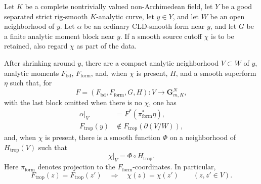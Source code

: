

\begin{lemma}
\label{lem:p21p3-gf-legal-source-localization}
Let \(K\) be a complete nontrivially valued non-Archimedean field, let
\(Y\) be a good separated strict rig-smooth \(K\)-analytic curve, let
\(y\in Y\), and let \(W\) be an open neighborhood of \(y\).  Let \(\alpha\)
be an ordinary CLD-smooth form near \(y\), and let \(G\) be a finite analytic
moment block near \(y\).  If a smooth source cutoff \(\chi\) is to be retained,
also regard \(\chi\) as part of the data.

After shrinking around \(y\), there are a compact analytic neighborhood
\(V\subset W\) of \(y\), analytic moments \(F_{\mathrm{bd}}\),
\(F_{\mathrm{form}}\), and, when \(\chi\) is present, \(H\), and a smooth
superform \(\eta\) such that, for
\[
 F=(F_{\mathrm{bd}},F_{\mathrm{form}},G,H):V\longrightarrow
       \mathbf G_{m,K}^{N},
\]
with the last block omitted when there is no \(\chi\), one has
\begin{align}
 \alpha|_V&=F^*(\pi_{\mathrm{form}}^*\eta),
 \label{eq:p21p3-gf-source-local-form}\\
 F_{\mathrm{trop}}(y)&\notin
       F_{\mathrm{trop}}(\partial(V/W)),
 \label{eq:p21p3-gf-source-local-boundary}
\end{align}
and, when \(\chi\) is present, there is a smooth function \(\Phi\) on a
neighborhood of \(H_{\mathrm{trop}}(V)\) such that
\begin{equation}
 \chi|_V=\Phi\circ H_{\mathrm{trop}}.
 \label{eq:p21p3-gf-source-cutoff-factorization}
\end{equation}
Here \(\pi_{\mathrm{form}}\) denotes projection to the
\(F_{\mathrm{form}}\)-coordinates.  In particular,
\begin{equation}
 F_{\mathrm{trop}}(z)=F_{\mathrm{trop}}(z')
       \quad\Longrightarrow\quad \chi(z)=\chi(z')
       \qquad(z,z'\in V).
 \label{eq:p21p3-gf-source-cutoff-fibre-constancy}
\end{equation}


\end{lemma}
